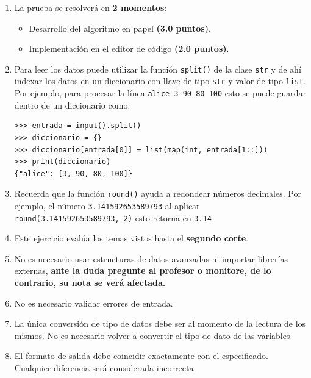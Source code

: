\documentclass[11pt,a4paper]{article}
\begin{document}
\begin{enumerate}
  \item La prueba se resolverá en \textbf{2 momentos}:
        \begin{itemize}
            \item Desarrollo del algoritmo en papel \textbf{(3.0 puntos)}.
            \item Implementación en el editor de código \textbf{(2.0 puntos)}.
        \end{itemize}
  \item Para leer los datos puede utilizar la función \lstinline[style=pythonstyle]|split()| de la clase \lstinline[style=pythonstyle]|str| y de ahí indexar los datos en un diccionario con llave de tipo \lstinline[style=pythonstyle]|str| y valor de tipo \lstinline[style=pythonstyle]|list|. Por ejemplo, para procesar la línea \texttt{alice 3 90 80 100} esto se puede guardar dentro de un diccionario como: 
        \begin{lstlisting}[style=pythonstyle]
>>> entrada = input().split()
>>> diccionario = {}
>>> diccionario[entrada[0]] = list(map(int, entrada[1::]))
>>> print(diccionario)
{"alice": [3, 90, 80, 100]}
        \end{lstlisting}

  \item Recuerda que la función \lstinline[style=pythonstyle]|round()| ayuda a redondear números decimales. Por ejemplo, el número \texttt{3.141592653589793} al aplicar \lstinline[style=pythonstyle]|round(3.141592653589793, 2)| esto retorna en \texttt{3.14}

  \item Este ejercicio evalúa los temas vistos hasta el \textbf{segundo corte}.

  \item No es necesario usar estructuras de datos avanzadas ni importar librerías externas, \textbf{ante la duda pregunte al profesor o monitore, de lo contrario, su nota se verá afectada.}

  \item No es necesario validar errores de entrada.

  \item La única conversión de tipo de datos debe ser al momento de la lectura de los mismos. No es necesario volver a convertir el tipo de dato de las variables.

  \item El formato de salida debe coincidir exactamente con el especificado. Cualquier diferencia será considerada incorrecta.
\end{enumerate}
\end{document}
